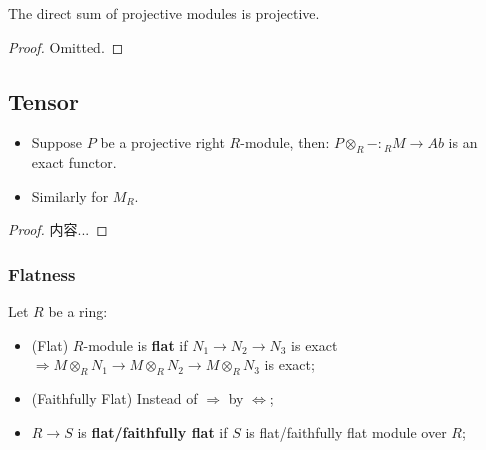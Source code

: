 \documentclass[Total.tex]{subfiles}
\begin{document}
			\begin{corollary}
				The direct sum of projective modules is projective.
			\end{corollary}
			\begin{proof}
				Omitted.
			\end{proof}
			\subsection{Tensor}
			\begin{proposition}
				\begin{itemize}
					\item Suppose $P$ be a projective right $R$-module, then: $P\otimes_R-:{}_R M\rightarrow Ab$ is an exact functor.
					\item Similarly for $M_R$.
				\end{itemize}
			\end{proposition}
			\begin{proof}
				内容...
			\end{proof}
			
			\subsubsection{Flatness}
				\begin{Def} Let $R$ be a ring:
					\begin{itemize}
						\item (Flat) $R$-module is \textbf{flat} if $N_1\rightarrow N_2\rightarrow N_3$ is exact$\Rightarrow M\otimes_R N_1\rightarrow M\otimes_R N_2\rightarrow M\otimes_R N_3$ is exact;
						\item (Faithfully Flat) Instead of $\Rightarrow$ by $\Leftrightarrow$;
						\item $R\rightarrow S$ is \textbf{flat/faithfully flat} if $S$ is flat/faithfully flat module over $R$;
					\end{itemize}
				\end{Def}
				
\end{document}

